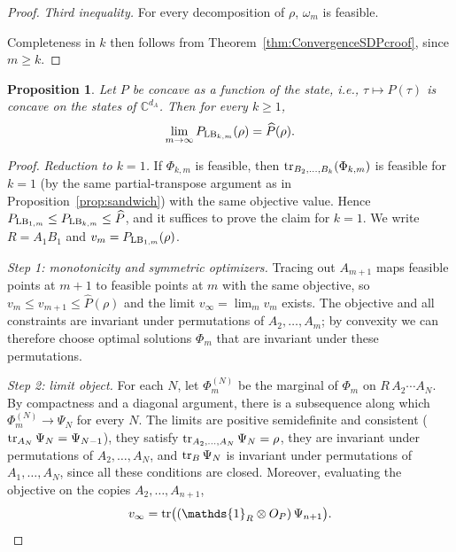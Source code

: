 \documentclass[aps,pra,twocolumn,showpacs,superscriptaddress,groupedaddress]{revtex4-2}
\newcommand{\one}[0]{\mathds{1}}
\newcommand{\C}{\mathds{C}}
\newcommand{\I}{\one}
\newtheorem{proposition}[theorem]{Proposition}
\begin{document}
\begin{widetext}
\begin{proof}
    \emph{Third inequality.} For every decomposition of $\rho$, $\omega_m$ is feasible.

    Completeness in $k$ then follows from Theorem~\ref{thm:ConvergenceSDPcroof}, since $m\geq k$.
    \end{proof}

    \begin{proposition}\label{prop:concave}
    Let $P$ be concave as a function of the state, i.e., $\tau\mapsto P(\tau)$ is concave on the states of $\C^{d_A}$. Then for every $k\geq1$,
    \begin{equation}
        \lim_{m\to\infty}P_{{\rm LB}_{k,m}}(\rho)=\widehat P(\rho).
    \end{equation}
    \end{proposition}

    \begin{proof}
    \emph{Reduction to $k=1$.} If $\Phi_{k,m}$ is feasible, then $\tr_{B_2,\dots,B_k}(\Phi_{k,m})$ is feasible for $k=1$ (by the same partial-transpose argument as in Proposition~\ref{prop:sandwich}) with the same objective value. Hence $P_{{\rm LB}_{1,m}}\leq P_{{\rm LB}_{k,m}}\leq\widehat P$, and it suffices to prove the claim for $k=1$. We write $R=A_1B_1$ and $v_m=P_{{\rm LB}_{1,m}}(\rho)$.

    \emph{Step 1: monotonicity and symmetric optimizers.} Tracing out $A_{m+1}$ maps feasible points at $m+1$ to feasible points at $m$ with the same objective, so $v_m\leq v_{m+1}\leq\widehat P(\rho)$ and the limit $v_\infty=\lim_m v_m$ exists. The objective and all constraints are invariant under permutations of $A_2,\dots,A_m$; by convexity we can therefore choose optimal solutions $\Phi_m$ that are invariant under these permutations.

    \emph{Step 2: limit object.} For each $N$, let $\Phi_m^{(N)}$ be the marginal of $\Phi_m$ on $R\,A_2\cdots A_N$. By compactness and a diagonal argument, there is a subsequence along which $\Phi_m^{(N)}\to\Psi_N$ for every $N$. The limits are positive semidefinite and consistent ($\tr_{A_N}\Psi_N=\Psi_{N-1}$), they satisfy $\tr_{A_2,\dots,A_N}\Psi_N=\rho$, they are invariant under permutations of $A_2,\dots,A_N$, and $\tr_B\Psi_N$ is invariant under permutations of $A_1,\dots,A_N$, since all these conditions are closed. Moreover, evaluating the objective on the copies $A_2,\dots,A_{n+1}$,
    \begin{equation}\label{eq:simplifiedLimitValue}
        v_\infty=\tr\!\big((\I_R\otimes O_P)\,\Psi_{n+1}\big).
    \end{equation}


\end{proof}
\end{widetext}
\end{document}
